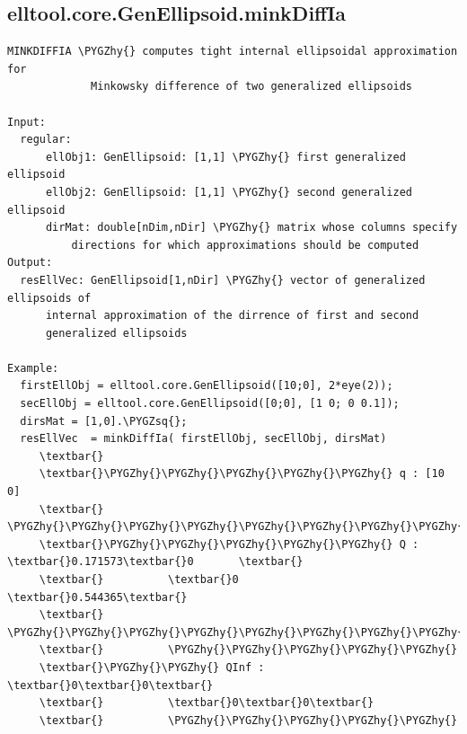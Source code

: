 \documentclass[letterpaper,10pt,english]{sphinxmanual}
\def\PYGZhy{\char`\-}
\def\PYGZsq{\char`\'}
\begin{document}
\subsection{elltool.core.GenEllipsoid.minkDiffIa}
\label{chap_functions:elltool-core-genellipsoid-minkdiffia}
\begin{Verbatim}[commandchars=\\\{\}]
MINKDIFFIA \PYGZhy{} computes tight internal ellipsoidal approximation for
             Minkowsky difference of two generalized ellipsoids

Input:
  regular:
      ellObj1: GenEllipsoid: [1,1] \PYGZhy{} first generalized ellipsoid
      ellObj2: GenEllipsoid: [1,1] \PYGZhy{} second generalized ellipsoid
      dirMat: double[nDim,nDir] \PYGZhy{} matrix whose columns specify
          directions for which approximations should be computed
Output:
  resEllVec: GenEllipsoid[1,nDir] \PYGZhy{} vector of generalized ellipsoids of
      internal approximation of the dirrence of first and second
      generalized ellipsoids

Example:
  firstEllObj = elltool.core.GenEllipsoid([10;0], 2*eye(2));
  secEllObj = elltool.core.GenEllipsoid([0;0], [1 0; 0 0.1]);
  dirsMat = [1,0].\PYGZsq{};
  resEllVec  = minkDiffIa( firstEllObj, secEllObj, dirsMat)
     \textbar{}
     \textbar{}\PYGZhy{}\PYGZhy{}\PYGZhy{}\PYGZhy{}\PYGZhy{} q : [10 0]
     \textbar{}          \PYGZhy{}\PYGZhy{}\PYGZhy{}\PYGZhy{}\PYGZhy{}\PYGZhy{}\PYGZhy{}\PYGZhy{}\PYGZhy{}\PYGZhy{}\PYGZhy{}\PYGZhy{}\PYGZhy{}\PYGZhy{}\PYGZhy{}\PYGZhy{}\PYGZhy{}\PYGZhy{}\PYGZhy{}
     \textbar{}\PYGZhy{}\PYGZhy{}\PYGZhy{}\PYGZhy{}\PYGZhy{} Q : \textbar{}0.171573\textbar{}0       \textbar{}
     \textbar{}          \textbar{}0       \textbar{}0.544365\textbar{}
     \textbar{}          \PYGZhy{}\PYGZhy{}\PYGZhy{}\PYGZhy{}\PYGZhy{}\PYGZhy{}\PYGZhy{}\PYGZhy{}\PYGZhy{}\PYGZhy{}\PYGZhy{}\PYGZhy{}\PYGZhy{}\PYGZhy{}\PYGZhy{}\PYGZhy{}\PYGZhy{}\PYGZhy{}\PYGZhy{}
     \textbar{}          \PYGZhy{}\PYGZhy{}\PYGZhy{}\PYGZhy{}\PYGZhy{}
     \textbar{}\PYGZhy{}\PYGZhy{} QInf : \textbar{}0\textbar{}0\textbar{}
     \textbar{}          \textbar{}0\textbar{}0\textbar{}
     \textbar{}          \PYGZhy{}\PYGZhy{}\PYGZhy{}\PYGZhy{}\PYGZhy{}
\end{Verbatim}
\end{document}
